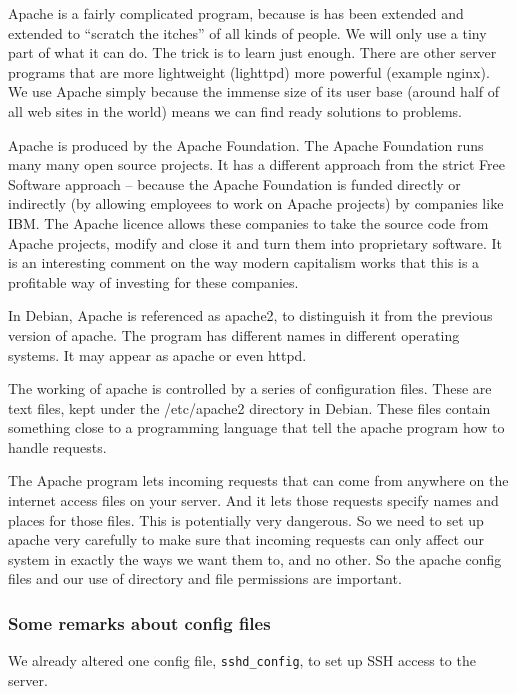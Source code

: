 \documentclass[12pt, a4paper]{article}
\begin{document}
Apache is a fairly complicated program, because is has been extended and extended to “scratch the itches” of all kinds of people. We will only use a tiny part of what it can do. The trick is to learn just enough. There are other server programs that are more lightweight (lighttpd) more powerful (example nginx). We use Apache simply because the immense size of its user base (around half of all web sites in the world) means we can find ready solutions to problems.

Apache is produced by the Apache Foundation. The Apache Foundation runs many many open source projects. It has a different approach from the strict Free Software approach – because the Apache Foundation is funded directly or indirectly (by allowing employees to work on Apache projects) by companies like IBM. The Apache licence allows these companies to take the source code from Apache projects, modify and close it and turn them into proprietary software. It is an interesting comment on the way modern capitalism works that this is a profitable way of investing for these companies. 

In Debian, Apache is referenced as apache2, to distinguish it from the previous version of apache. The program has different names in different operating systems. It may appear as apache or even httpd.

The working of apache is controlled by a series of configuration files. These are text files, kept under the /etc/apache2 directory in Debian. These files contain something close to a programming language that tell the apache program how to handle requests.

The Apache program lets incoming requests that can come from anywhere on the internet access files on your server. And it lets those requests specify names and places for those files. This is potentially very dangerous. So we need to set up apache very carefully to make sure that incoming requests can only affect our system in exactly the ways we want them to, and no other. So the apache config files and our use of directory and file permissions are important.

\subsubsection*{Some remarks about config files} 
We already altered one config file, \verb|sshd_config|, to set up SSH access to the server. 
\end{document}
